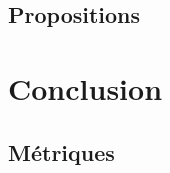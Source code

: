\documentclass{EPL-master-thesis-covers-FR}
\begin{document}
			

		\section{Propositions}

			
	\chapter{Conclusion}

		

		\section{Métriques}
		

	{}
	
		

	

	\setlength{\parskip}{0em}
	\backcoverpage
\end{document}

